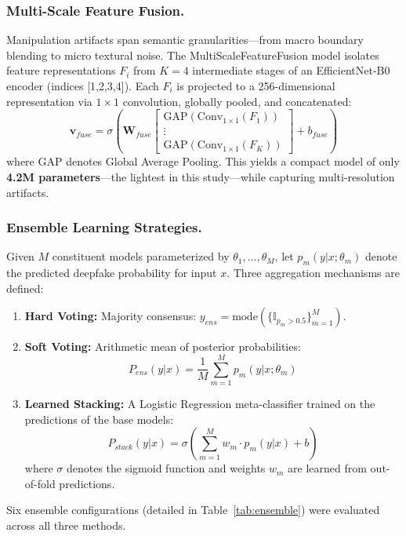 \documentclass[runningheads]{llncs}
\begin{document}
\subsubsection{Multi-Scale Feature Fusion.}
Manipulation artifacts span semantic granularities---from macro boundary blending to micro textural noise. The MultiScaleFeatureFusion model isolates feature representations $F_i$ from $K=4$ intermediate stages of an EfficientNet-B0 encoder (indices [1,2,3,4]). Each $F_i$ is projected to a 256-dimensional representation via $1\times1$ convolution, globally pooled, and concatenated:
\begin{equation}
    \mathbf{v}_{fuse} = \sigma \left( \mathbf{W}_{fuse} \begin{bmatrix}
        \text{GAP}(\text{Conv}_{1\times1}(F_1)) \\
        \vdots \\
        \text{GAP}(\text{Conv}_{1\times1}(F_K))
    \end{bmatrix} + b_{fuse} \right)
\end{equation}
where GAP denotes Global Average Pooling. This yields a compact model of only \textbf{4.2M parameters}---the lightest in this study---while capturing multi-resolution artifacts.

\subsubsection{Ensemble Learning Strategies.}
Given $M$ constituent models parameterized by $\theta_1, \ldots, \theta_M$, let $p_m(y|x; \theta_m)$ denote the predicted deepfake probability for input $x$. Three aggregation mechanisms are defined:
\begin{enumerate}
    \item \textbf{Hard Voting:} Majority consensus: $y_{ens} = \text{mode}(\{\mathbb{I}_{p_m > 0.5}\}_{m=1}^M)$.
    \item \textbf{Soft Voting:} Arithmetic mean of posterior probabilities:
    \begin{equation}
        P_{ens}(y|x) = \frac{1}{M}\sum_{m=1}^{M} p_m(y|x; \theta_m)
    \end{equation}
    \item \textbf{Learned Stacking:} A Logistic Regression meta-classifier trained on the predictions of the base models:
    \begin{equation}
        P_{stack}(y|x) = \sigma\left(\sum_{m=1}^{M} w_m \cdot p_m(y|x) + b \right)
    \end{equation}
    where $\sigma$ denotes the sigmoid function and weights $w_m$ are learned from out-of-fold predictions.
\end{enumerate}
Six ensemble configurations (detailed in Table~\ref{tab:ensemble}) were evaluated across all three methods.
\end{document}
